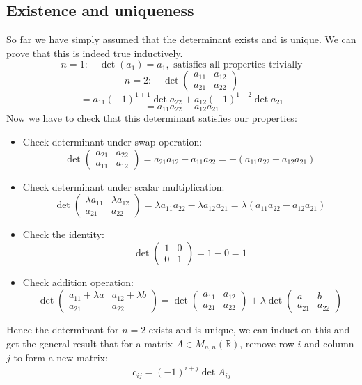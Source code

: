 \documentclass[12pt]{article}
\begin{document}
\subsection*{Existence and uniqueness}
So far we have simply assumed that the determinant exists and is unique. We can prove that this is indeed true inductively.
\[n=1:\quad\det(a_1)=a_1, \text{ satisfies all properties trivially}\]
\[n=2:\quad \det\begin{pmatrix}
    a_{11} & a_{12} \\
    a_{21} & a_{22}
\end{pmatrix}\]
\[=a_{11}(-1)^{1+1}\det a_{22}+a_{12}(-1)^{1+2}\det a_{21}\]
\[=a_{11}a_{22}-a_{12}a_{21}\]
Now we have to check that this determinant satisfies our properties:
\begin{itemize}
    \item Check determinant under swap operation:
    \[\det\begin{pmatrix}
        a_{21} & a_{22} \\
        a_{11} & a_{12}
    \end{pmatrix}=a_{21}a_{12}-a_{11}a_{22}=-(a_{11}a_{22}-a_{12}a_{21})\]
    \item Check determinant under scalar multiplication:
    \[\det\begin{pmatrix}
        \lambda a_{11} & \lambda a_{12} \\
        a_{21} & a_{22}
    \end{pmatrix}=\lambda a_{11}a_{22}-\lambda a_{12}a_{21}=\lambda(a_{11}a_{22}-a_{12}a_{21})\]
    \item Check the identity:
    \[\det\begin{pmatrix}
        1 & 0 \\
        0 & 1
    \end{pmatrix}=1-0=1\]
    \item Check addition operation:
    \[\det\begin{pmatrix}
        a_{11}+\lambda a & a_{12}+\lambda b \\
        a_{21} & a_{22}
    \end{pmatrix}=\det\begin{pmatrix}
        a_{11} & a_{12} \\
        a_{21} & a_{22}
    \end{pmatrix}+\lambda\det\begin{pmatrix}
        a & b \\
        a_{21} & a_{22}
    \end{pmatrix}\]
\end{itemize}
Hence the determinant for \(n=2\) exists and is unique, we can induct on this and get the general result that for a matrix \(A\in M_{n,n}(\mathbb{R})\), remove row \(i\) and column \(j\) to form a new matrix:
\[c_{ij}=(-1)^{i+j}\det{A_{ij}}\]
\end{document}
